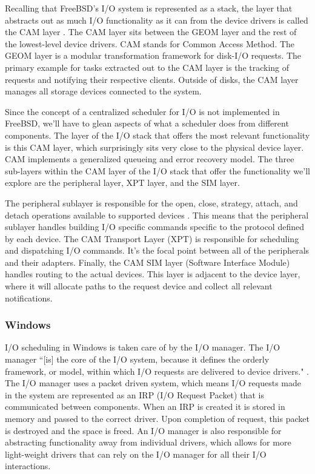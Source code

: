 \par Recalling that FreeBSD's I/O system is represented as a stack, the layer that abstracts out as much I/O functionality as it can from the device drivers is called the CAM layer \cite{bsd:1}.
The CAM layer sits between the GEOM layer and the rest of the lowest-level device drivers.
CAM stands for Common Access Method.
The GEOM layer is a modular transformation framework for disk-I/O requests.
The primary example for tasks extracted out to the CAM layer is the tracking of requests and notifying their respective clients.
Outside of disks, the CAM layer manages all storage devices connected to the system.

\par Since the concept of a centralized scheduler for I/O is not implemented in FreeBSD, we'll have to glean aspects of what a scheduler does from different components.
The layer of the I/O stack that offers the most relevant functionality is this CAM layer, which surprisingly sits very close to the physical device layer.
CAM implements a generalized queueing and error recovery model.
The three sub-layers within the CAM layer of the I/O stack that offer the functionality we'll explore are the peripheral layer, XPT layer, and the SIM layer.

\par The peripheral sublayer is responsible for the open, close, strategy, attach, and detach operations available to supported devices \cite{bsd:1}.
This means that the peripheral sublayer handles building I/O specific commands specific to the protocol defined by each device.
The CAM Transport Layer (XPT) is responsible for scheduling and dispatching I/O commands.
It's the focal point between all of the peripherals and their adapters.
Finally, the CAM SIM layer (Software Interface Module) handles routing to the actual devices.
This layer is adjacent to the device layer, where it will allocate paths to the request device and collect all relevant notifications.

\subsubsection{Windows}
\label{sub:Scheduling Windows}
\par I/O scheduling in Windows is taken care of by the I/O manager.
The I/O manager ``[is] the core of the I/O system, because it defines the orderly framework, or model, within which I/O requests are delivered to device drivers." \cite{win:2}.
The I/O manager uses a packet driven system, which means I/O requests made in the system are represented as an IRP (I/O Request Packet) that is communicated between components.
When an IRP is created it is stored in memory and passed to the correct driver.
Upon completion of request, this packet is destroyed and the space is freed.
An I/O manager is also responsible for abstracting functionality away from individual drivers, which allows for more light-weight drivers that can rely on the I/O manager for all their I/O interactions.

